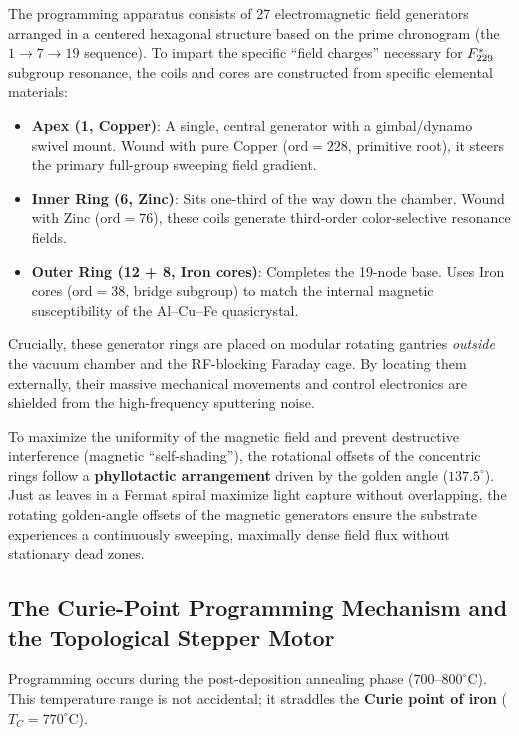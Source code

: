 The programming apparatus consists of 27 electromagnetic field generators arranged in a centered hexagonal structure based on the prime chronogram (the $1 \to 7 \to 19$ sequence). To impart the specific ``field charges'' necessary for $F_{229}^*$ subgroup resonance, the coils and cores are constructed from specific elemental materials:
\begin{itemize}
    \item \textbf{Apex (1, Copper)}: A single, central generator with a gimbal/dynamo swivel mount. Wound with pure Copper ($\mathrm{ord}=228$, primitive root), it steers the primary full-group sweeping field gradient.
    \item \textbf{Inner Ring (6, Zinc)}: Sits one-third of the way down the chamber. Wound with Zinc ($\mathrm{ord}=76$), these coils generate third-order color-selective resonance fields.
    \item \textbf{Outer Ring (12 + 8, Iron cores)}: Completes the 19-node base. Uses Iron cores ($\mathrm{ord}=38$, bridge subgroup) to match the internal magnetic susceptibility of the Al--Cu--Fe quasicrystal.
\end{itemize}

Crucially, these generator rings are placed on modular rotating gantries \emph{outside} the vacuum chamber and the RF-blocking Faraday cage. By locating them externally, their massive mechanical movements and control electronics are shielded from the high-frequency sputtering noise. 

To maximize the uniformity of the magnetic field and prevent destructive interference (magnetic ``self-shading''), the rotational offsets of the concentric rings follow a \textbf{phyllotactic arrangement} driven by the golden angle ($137.5^\circ$). Just as leaves in a Fermat spiral maximize light capture without overlapping, the rotating golden-angle offsets of the magnetic generators ensure the substrate experiences a continuously sweeping, maximally dense field flux without stationary dead zones.

\subsection{The Curie-Point Programming Mechanism and the Topological Stepper Motor}

Programming occurs during the post-deposition annealing phase ($700$--$800^\circ$C). This temperature range is not accidental; it straddles the \textbf{Curie point of iron} ($T_C = 770^\circ$C). 

